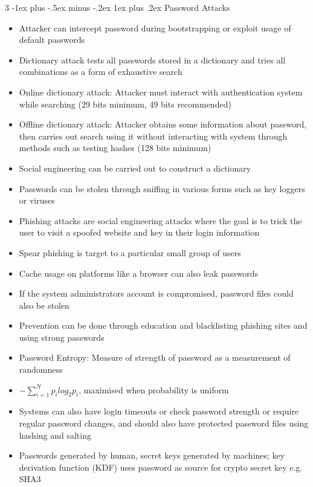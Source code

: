 \documentclass[10pt, landscape]{article}
\makeatletter
\renewcommand{\subsubsection}{\@startsection{subsubsection}{4}{0mm}%
                                {-1ex plus -.5ex minus -.2ex}%
                                {1ex plus .2ex}%
                                {\normalfont\small\bfseries}}%
\makeatother
\begin{document}
\begin{multicols*}{3}
\subsubsection{Password Attacks}
\begin{itemize}
    \item Attacker can intercept password during bootstrapping or exploit usage of default passwords
    \item Dictionary attack tests all passwords stored in a dictionary and tries all combinations as a form of exhaustive search
    \item Online dictionary attack: Attacker must interact with authentication system while searching (29 bits minimum, 49 bits recommended)
    \item Offline dictionary attack: Attacker obtains some information about password, then carries out search using it without interacting with system through methods such as testing hashes (128 bits minimum)
    \item Social engineering can be carried out to construct a dictionary
    \item Passwords can be stolen through sniffing in various forms such as key loggers or viruses
    \item Phishing attacks are social engineering attacks where the goal is to trick the user to visit a spoofed website and key in their login information
    \item Spear phishing is target to a particular small group of users
    \item Cache usage on platforms like a browser can also leak passwords
    \item If the system administrators account is compromised, password files could also be stolen
    \item Prevention can be done through education and blacklisting phishing sites and using strong passwords
    \item Password Entropy: Measure of strength of password as a measurement of randomness
    \item $-\sum_{i=1}^Np_i log_2p_i$, maximised when probability is uniform
    \item Systems can also have login timeouts or check password strength or require regular password changes, and should also have protected password files using hashing and salting
    \item Passwords generated by human, secret keys generated by machines; key derivation function (KDF) uses password as source for crypto secret key e.g. SHA3
\end{itemize}


\end{multicols*}
\end{document}
